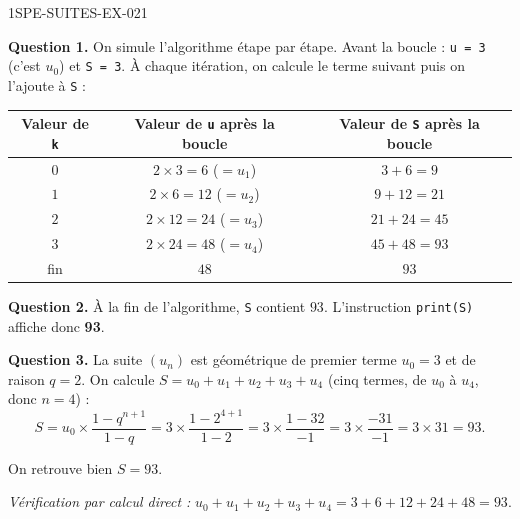 \begin{corrige}{1SPE-SUITES-EX-021}


\textbf{Question 1.} On simule l'algorithme étape par étape. Avant la boucle : \texttt{u = 3} (c'est $u_0$) et \texttt{S = 3}. À chaque itération, on calcule le terme suivant puis on l'ajoute à \texttt{S} :

\medskip
\begin{center}
\begin{tabular}{|c|c|c|}
\hline
Valeur de \texttt{k} & Valeur de \texttt{u} après la boucle & Valeur de \texttt{S} après la boucle \\
\hline
$0$ & $2 \times 3 = 6$ ($= u_1$) & $3 + 6 = 9$ \\
\hline
$1$ & $2 \times 6 = 12$ ($= u_2$) & $9 + 12 = 21$ \\
\hline
$2$ & $2 \times 12 = 24$ ($= u_3$) & $21 + 24 = 45$ \\
\hline
$3$ & $2 \times 24 = 48$ ($= u_4$) & $45 + 48 = 93$ \\
\hline
fin & $48$ & $93$ \\
\hline
\end{tabular}
\end{center}
\medskip


\textbf{Question 2.} À la fin de l'algorithme, \texttt{S} contient $93$. L'instruction \texttt{print(S)} affiche donc \textbf{93}.


\textbf{Question 3.} La suite $(u_n)$ est géométrique de premier terme $u_0 = 3$ et de raison $q = 2$. On calcule $S = u_0 + u_1 + u_2 + u_3 + u_4$ (cinq termes, de $u_0$ à $u_4$, donc $n = 4$) :
\[
S = u_0 \times \frac{1 - q^{n+1}}{1 - q} = 3 \times \frac{1 - 2^{4+1}}{1 - 2} = 3 \times \frac{1 - 32}{-1} = 3 \times \frac{-31}{-1} = 3 \times 31 = 93.
\]

On retrouve bien $S = 93$. \checkmark

\medskip
\textit{Vérification par calcul direct :} $u_0 + u_1 + u_2 + u_3 + u_4 = 3 + 6 + 12 + 24 + 48 = 93$. \checkmark

\end{corrige}
